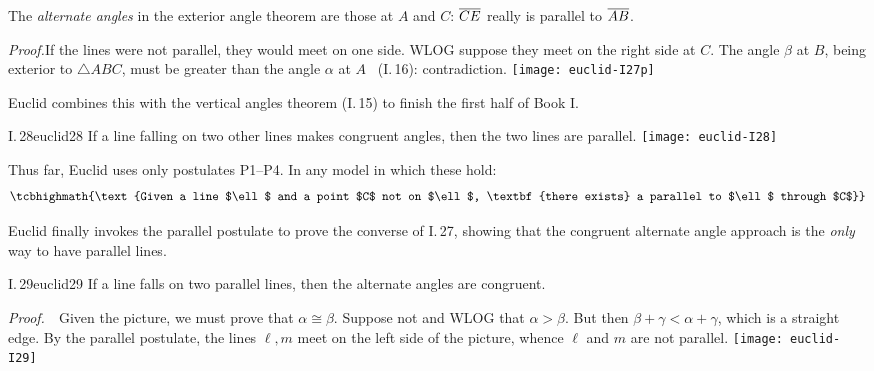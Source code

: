 The \emph{alternate angles} in the exterior angle theorem are those at $A$ and $C$: $\overline{CE}$ really is parallel to $\overline{AB}$.

\begin{tcolorbox}[proofstyle,lower separated=false, sidebyside, sidebyside align=top seam, sidebyside gap=0pt, righthand width=0.37\linewidth]
	\emph{Proof.}\lstsp If the lines were not parallel, they would meet on one side. WLOG suppose they meet on the right side at $C$.\smallbreak
	The angle $\beta$ at $B$, being exterior to $\triangle ABC$, must be greater than the angle $\alpha$ at $A$ \ (I.\,16): contradiction.
	\tcblower
	\flushright
	\texttt{[image: euclid-I27p]}\\[-12pt]\hfill\qedsymbol
\end{tcolorbox}

Euclid combines this with the vertical angles theorem (I.\,15) to finish the first half of Book I.

\begin{cor}[lower separated=false, sidebyside, sidebyside align=top seam, sidebyside gap=0pt, righthand width=0.32\linewidth]{I.\,28}{euclid28}
	If a line falling on two other lines makes congruent angles, then the two lines are parallel.
	\tcblower
	\flushright\texttt{[image: euclid-I28]}
\end{cor}


Thus far, Euclid uses only postulates P1--P4. In any model in which these hold:
\[
	\tcbhighmath{\text{Given a line $\ell$ and a point $C$ not on $\ell$, \textbf{there exists} a parallel to $\ell$ through $C$}}
\]
\goodbreak




Euclid finally invokes the parallel postulate to prove the converse of I.\,27, showing that the congruent alternate angle approach is the \emph{only} way to have parallel lines.

\begin{thm}{I.\,29}{euclid29}
	If a line falls on two parallel lines, then the alternate angles are congruent.
\end{thm}

\begin{tcolorbox}[proofstyle,lower separated=false, sidebyside, sidebyside align=top seam, sidebyside gap=0pt, righthand width=0.37\linewidth]
	\emph{Proof.}\ \ Given the picture, we must prove that $\alpha\cong\beta$.\smallbreak
	Suppose not and WLOG that $\alpha>\beta$.\smallbreak
	But then $\beta+\gamma<\alpha+\gamma$, which is a straight edge.\smallbreak
	By the parallel postulate, the lines $\ell,m$ meet on the left side of the picture, whence $\ell$ and $m$ are not parallel.
	\tcblower
	\flushright
	\texttt{[image: euclid-I29]}\\[-10pt]\qedsymbol
\end{tcolorbox}

